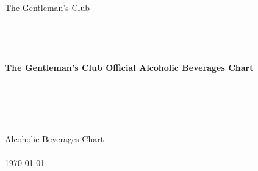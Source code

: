 \documentclass[12pt,a4paper,oneside,norsk]{article}
\begin{document}
    \begin{titlepage}
    \begin{center}
    \ \\
    \ \\
    \ \\
    \ \\
    \ \\
    \ \\
    The Gentleman's Club \\
    \ \\
    \ \\
    \ \\
    \ \\{\large \bfseries
    The Gentleman's Club Official Alcoholic Beverages Chart\\
    }
    \ \\
    \ \\
    \ \\
    \ \\
    \ \\
    {\large
    Alcoholic Beverages Chart\\
    }
    \ \\
    {\today\ \\}
    \ \\
    \ \\
    \ \\
    \ \\
    \ \\
    \ \\
    \ \\
    \ \\
    \ \\
    \ \\
    \ \\
    \ \\
    \ \\
    \ \\
    \ \\
    \ \\
    \ \\
    \ \\
    \ \\
    \ \\
    \ \\
    \ \\
    \ \\
    \ \\
   	\ \\
    \ \\
    \ \\
    \ \\
   	\ \\
    \ \\
    \end{center}
    \end{titlepage}
    
\end{document}
